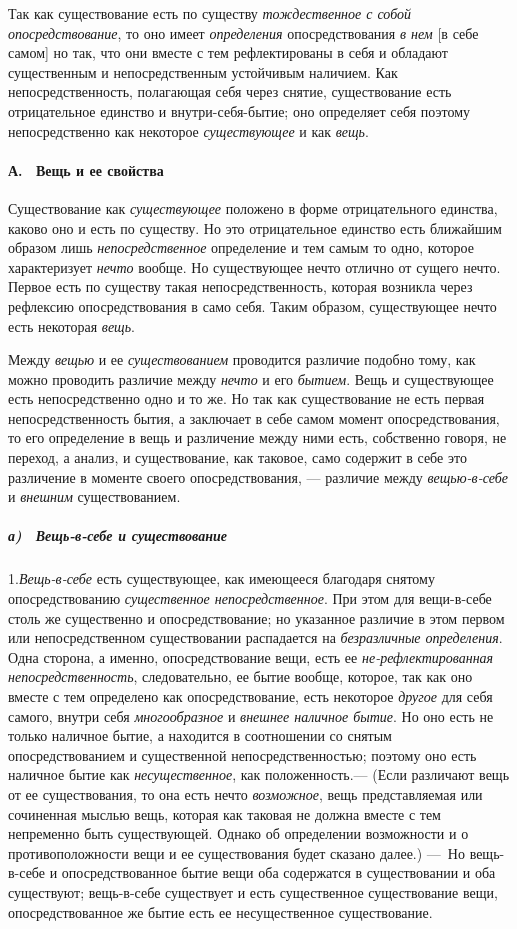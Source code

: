 Так как существование есть по существу
{\em тождественное с собой опосредствование}, то оно
имеет {\em определения} опосредствования
{\em в нем} [в себе самом] но так, что они вместе с тем
рефлектированы в себя и обладают существенным и непосредственным устойчивым
наличием. Как непосредственность, полагающая себя через снятие,
существование есть отрицательное единство и внутри-себя-бытие; оно
определяет себя поэтому непосредственно как некоторое
{\em существующее} и как
{\em вещь}.

\paragraph[А. \ Вещь и ее свойства]{А. \ Вещь и ее свойства}
Существование как
{\em существующее} положено в форме отрицательного
единства, каково оно и есть по существу. Но это отрицательное единство есть
ближайшим образом лишь {\em непосредственное}
определение и тем самым то одно, которое характеризует
{\em нечто} вообще. Но существующее нечто отлично от
сущего нечто. Первое есть по существу такая непосредственность, которая
возникла через рефлексию опосредствования в само себя. Таким образом,
существующее нечто есть некоторая {\em вещь}.

Между {\em вещью} и ее
{\em существованием} проводится различие подобно тому,
как можно проводить различие между {\em нечто} и его
{\em бытием}. Вещь и существующее есть непосредственно
одно и то же. Но так как существование не есть первая непосредственность
бытия, а заключает в себе самом момент опосредствования, то его определение
в вещь и различение между ними есть, собственно говоря, не переход, а
анализ, и существование, как таковое, само содержит в себе это различение в
моменте своего опосредствования, — различие между
{\em вещью-в-себе} и {\em внешним
}существованием.

\subparagraph[а) \ Вещь{}-в{}-себе и существование]{а) \ Вещь-в-себе и
существование}
1.{\em  Вещь-в-себе} есть
существующее, как имеющееся благодаря снятому опосредствованию
{\em существенное непосредственное}. При этом для
вещи-в-себе столь же существенно и опосредствование; но указанное различие
в этом первом или непосредственном существовании распадается на
{\em безразличные определения}. Одна сторона, а именно,
опосредствование вещи, есть ее {\em не-рефлектированная
непосредственность}, следовательно, ее бытие вообще, которое, так как оно
вместе с тем определено как опосредствование, есть некоторое
{\em другое} для себя самого, внутри себя
{\em многообразное} и {\em внешнее
наличное бытие}. Но оно есть не только наличное бытие, а находится в
соотношении со снятым опосредствованием и существенной непосредственностью;
поэтому оно есть наличное бытие как
{\em несущественное}, как положенность.— (Если
различают вещь от ее существования, то она есть нечто
{\em возможное}, вещь представляемая или сочиненная
мыслью вещь, которая как таковая не должна вместе с тем непременно быть
существующей. Однако об определении возможности и о противоположности вещи
и ее существования будет сказано далее.) —~Но вещь-в-себе и
опосредствованное бытие вещи оба содержатся в существовании и оба
существуют; вещь-в-себе существует и есть существенное существование вещи,
опосредствованное же бытие есть ее несущественное существование.

